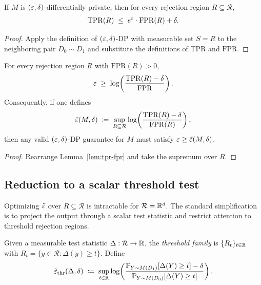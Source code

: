 \begin{lemma}
\label{lem:tpr-fpr}
If $M$ is $(\varepsilon, \delta)$-differentially private, then for every rejection region $R \subseteq \mathcal{R}$,
\[
  \mathrm{TPR}(R) \;\leq\; e^\varepsilon \cdot \mathrm{FPR}(R) + \delta.
\]
\end{lemma}

\begin{proof}
Apply the definition of $(\varepsilon, \delta)$-DP with measurable set $S = R$ to the neighboring pair $D_0 \sim D_1$ and substitute the definitions of $\mathrm{TPR}$ and $\mathrm{FPR}$.
\end{proof}

\begin{proposition}
\label{prop:eps-lb}
For every rejection region $R$ with $\mathrm{FPR}(R) > 0$,
\begin{equation}
  \varepsilon \;\geq\; \log\!\left(\frac{\mathrm{TPR}(R) - \delta}{\mathrm{FPR}}\right).
  \label{eq:eps-lb-pointwise}
\end{equation}
Consequently, if one defines
\[
  \tilde{\varepsilon}(M, \delta) \;\coloneqq\; \sup_{R \subseteq \mathcal{R}}
  \log\!\left(\frac{\mathrm{TPR}(R) - \delta}{\mathrm{FPR}(R)}\right),
\]
then any valid $(\varepsilon, \delta)$-DP guarantee for $M$ must satisfy $\varepsilon \geq \tilde{\varepsilon}(M, \delta)$.
\end{proposition}

\begin{proof}
Rearrange Lemma~\ref{lem:tpr-fpr} and take the supremum over $R$.
\end{proof}

\subsection{Reduction to a scalar threshold test}
\label{sec:threshold}

Optimizing $\tilde{\varepsilon}$ over $R \subseteq \mathcal{R}$ is intractable for $\mathcal{R} = \mathbb{R}^d$. The standard simplification is to project the output through a scalar test statistic and restrict attention to threshold rejection regions.

\begin{definition}
\label{def:thr-test}
Given a measurable test statistic $\Delta : \mathcal{R} \to \mathbb{R}$, the \emph{threshold family} is $\{R_t\}_{t \in \mathbb{R}}$ with $R_t = \{y \in \mathcal{R} : \Delta(y) \geq t\}$. Define
\[
  \tilde{\varepsilon}_{\mathrm{thr}}(\Delta, \delta)
  \;\coloneqq\; \sup_{t \in \mathbb{R}}
  \log\!\left(\frac{\mathbb{P}_{Y \sim M(D_1)}[\Delta(Y) \geq t] - \delta}
                     {\mathbb{P}_{Y \sim M(D_0)}[\Delta(Y) \geq t]}\right).
\]
\end{definition}

